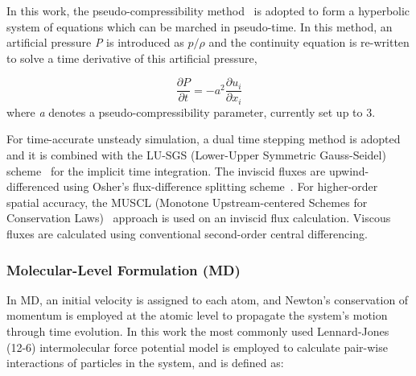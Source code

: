 \documentclass[preprint,12pt]{elsarticle}
\begin{document}
In this work, the pseudo-compressibility method~\cite{PseudoCompressibility} is adopted to form a hyperbolic system of equations which can be marched in pseudo-time. In this method, an artificial pressure \textit{P} is introduced as $p/\rho$ and the continuity equation is re-written to solve a time derivative of this artificial pressure,

\vspace{-.2em}
\begin{equation}
\frac{\partial P}{\partial t} = - a^2 \frac{\partial {u}_{i}}{\partial {x}_{i}}
 \label{eq:Pseudo}
\end{equation}
where \textit{a} denotes a pseudo-compressibility parameter, currently set up to 3.

For time-accurate unsteady simulation, a dual time stepping method is adopted and it is combined with the LU-SGS (Lower-Upper Symmetric Gauss-Seidel) scheme~\cite{LU-SGS} for the implicit time integration. The inviscid fluxes are upwind-differenced using Osher's flux-difference splitting scheme~\cite{Osher}. For higher-order spatial accuracy, the MUSCL (Monotone Upstream-centered Schemes for Conservation Laws)~\cite{MUSCL} approach is used on an inviscid flux calculation. Viscous fluxes are calculated using conventional second-order central differencing.



\subsubsection{Molecular-Level Formulation (MD)}
\label{sec:numerical_MDschemes}

In MD, an initial velocity is assigned to each atom, and Newton's conservation of momentum is employed at the atomic level to propagate the system's motion through time evolution. In this work the most commonly used Lennard-Jones (12-6) intermolecular force potential model is employed to calculate pair-wise interactions of particles in the system, and is defined as: 
\end{document}

